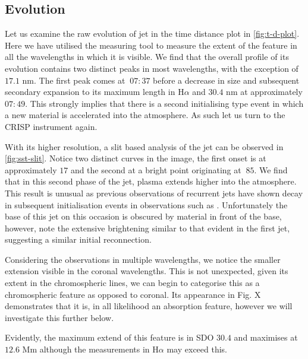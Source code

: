 \documentclass{emulateapj}
\begin{document}
\subsection{Evolution}
Let us examine the raw evolution of jet in the time distance plot in \cref{fig:t-d-plot}.
Here we have utilised the measuring tool to measure the extent of the feature in all the wavelengths in which it is visible.
We find that the overall profile of its evolution contains two distinct peaks in most wavelengths, with the exception of $17.1$ nm.
The first peak comes at $~07:37$ before a decrease in size and subsequent secondary expansion to its maximum length in H$\alpha$ and $30.4$ nm at approximately $07:49$.
This strongly implies that there is a second initialising type event in which a new material is accelerated into the atmosphere.
As such let us turn to the CRISP instrument again.

With its higher resolution, a slit based analysis of the jet can be observed in \cref{fig:sst-slit}.
Notice two distinct curves in the image, the first onset is at approximately $17$ and the second at a bright point originating at $~85$.
We find that in this second phase of the jet, plasma extends higher into the atmosphere.
This result is unusual as previous observations of recurrent jets have shown decay in subsequent initialisation events in observations such as \cite{Jiang2007}.
Unfortunately the base of this jet on this occasion is obscured by material in front of the base, however, note the extensive brightening similar to that evident in the first jet, suggesting a similar initial reconnection.

Considering the observations in multiple wavelengths, we notice the smaller extension visible in the coronal wavelengths.
This is not unexpected, given its extent in the chromospheric lines, we can begin to categorise this as a chromospheric feature as opposed to coronal.
Its appearance in Fig. X demonstrates that it is, in all likelihood an absorption feature, however we will investigate this further below.

Evidently, the maximum extend of this feature is in SDO $30.4$ and maximises at $12.6$ Mm although the measurements in H$\alpha$ may exceed this.
\end{document}
